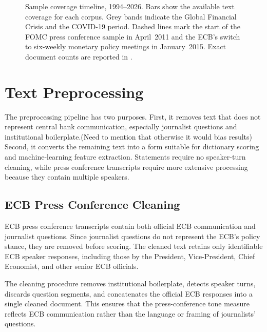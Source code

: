 \begin{figure}[htbp]
{%
}
\caption[Sample coverage timeline]{Sample coverage timeline, 1994--2026. Bars show
the available text coverage for each corpus. Grey bands indicate the Global Financial
Crisis and the COVID-19 period. Dashed lines mark the start of the FOMC press
conference sample in April~2011 and the ECB's switch to six-weekly monetary policy
meetings in January~2015. Exact document counts are reported in
.}
\label{fig:sample_coverage}
\end{figure}


\section{Text Preprocessing}
\label{sec:data_preprocessing}

The preprocessing pipeline has two purposes. First, it removes text that does not
represent central bank communication, especially journalist questions and
institutional boilerplate.(Need to mention that otherwise it would bias results) Second, it converts the remaining text into a form suitable
for dictionary scoring and machine-learning feature extraction. Statements require no
speaker-turn cleaning, while press conference transcripts require more extensive
processing because they contain multiple speakers.

\subsection{ECB Press Conference Cleaning}
\label{sec:data_ecb_pc_clean}

ECB press conference transcripts contain both official ECB communication
and journalist questions. Since journalist questions do not represent the
ECB's policy stance, they are removed before scoring. The cleaned text
retains only identifiable ECB speaker responses, including those by the
President, Vice-President, Chief Economist, and other senior ECB
officials.

The cleaning procedure removes institutional boilerplate, detects
speaker turns, discards question segments, and concatenates the official
ECB responses into a single cleaned document. This ensures that the
press-conference tone measure reflects ECB communication rather than the
language or framing of journalists' questions.


